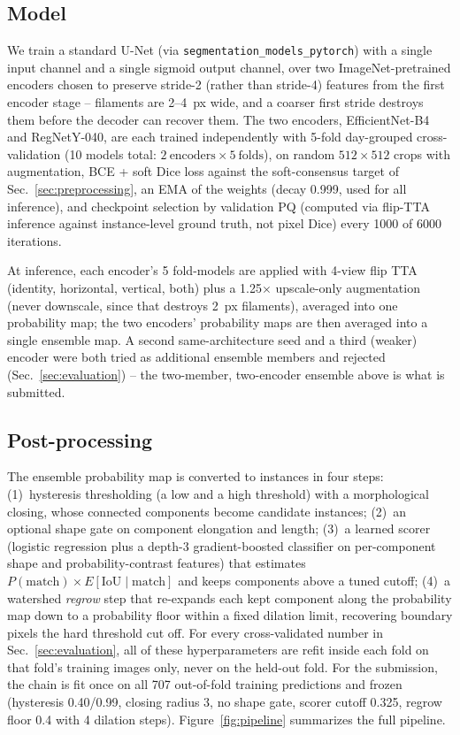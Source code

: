 \documentclass[sigconf]{acmart}
\begin{document}
\subsection{Model}\label{sec:model}
    We train a standard U-Net \cite{ronneberger2015unet} (via \texttt{segmentation\_models\_pytorch}) with a single input channel and a single sigmoid output channel, over two ImageNet-pretrained encoders chosen to preserve stride-2 (rather than stride-4) features from the first encoder stage -- filaments are 2--4~px wide, and a coarser first stride destroys them before the decoder can recover them. The two encoders, EfficientNet-B4 and RegNetY-040, are each trained independently with 5-fold day-grouped cross-validation (10 models total: $2~\text{encoders} \times 5~\text{folds}$), on random $512\times512$ crops with augmentation, BCE + soft Dice loss against the soft-consensus target of Sec.~\ref{sec:preprocessing}, an EMA of the weights (decay 0.999, used for all inference), and checkpoint selection by validation PQ (computed via flip-TTA inference against instance-level ground truth, not pixel Dice) every 1000 of 6000 iterations.

    At inference, each encoder's 5 fold-models are applied with 4-view flip TTA (identity, horizontal, vertical, both) plus a 1.25$\times$ upscale-only augmentation (never downscale, since that destroys 2~px filaments), averaged into one probability map; the two encoders' probability maps are then averaged into a single ensemble map. A second same-architecture seed and a third (weaker) encoder were both tried as additional ensemble members and rejected (Sec.~\ref{sec:evaluation}) -- the two-member, two-encoder ensemble above is what is submitted.

\subsection{Post-processing}\label{sec:postprocessing}
    The ensemble probability map is converted to instances in four steps: (1)~hysteresis thresholding (a low and a high threshold) with a morphological closing, whose connected components become candidate instances; (2)~an optional shape gate on component elongation and length; (3)~a learned scorer (logistic regression plus a depth-3 gradient-boosted classifier on per-component shape and probability-contrast features) that estimates $P(\text{match})\times E[\text{IoU}\mid\text{match}]$ and keeps components above a tuned cutoff; (4)~a watershed \emph{regrow} step that re-expands each kept component along the probability map down to a probability floor within a fixed dilation limit, recovering boundary pixels the hard threshold cut off. For every cross-validated number in Sec.~\ref{sec:evaluation}, all of these hyperparameters are refit inside each fold on that fold's training images only, never on the held-out fold. For the submission, the chain is fit once on all 707 out-of-fold training predictions and frozen (hysteresis 0.40/0.99, closing radius 3, no shape gate, scorer cutoff 0.325, regrow floor 0.4 with 4 dilation steps). Figure~\ref{fig:pipeline} summarizes the full pipeline.
\end{document}
